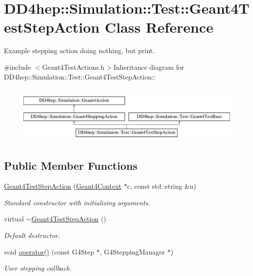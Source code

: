 \hypertarget{class_d_d4hep_1_1_simulation_1_1_test_1_1_geant4_test_step_action}{
\section{DD4hep::Simulation::Test::Geant4TestStepAction Class Reference}
\label{class_d_d4hep_1_1_simulation_1_1_test_1_1_geant4_test_step_action}
}


Example stepping action doing nothing, but print.  


{\ttfamily \#include $<$Geant4TestActions.h$>$}Inheritance diagram for DD4hep::Simulation::Test::Geant4TestStepAction::\begin{figure}[H]
\begin{center}
\leavevmode
\includegraphics[height=2.91667cm]{class_d_d4hep_1_1_simulation_1_1_test_1_1_geant4_test_step_action}
\end{center}
\end{figure}
\subsection*{Public Member Functions}
\begin{DoxyCompactItemize}
\item 
\hyperlink{class_d_d4hep_1_1_simulation_1_1_test_1_1_geant4_test_step_action_af4446b1635ed2c17bee1b7c074f3924d}{Geant4TestStepAction} (\hyperlink{class_d_d4hep_1_1_simulation_1_1_geant4_context}{Geant4Context} $\ast$c, const std::string \&n)
\begin{DoxyCompactList}\small\item\em Standard constructor with initializing arguments. \item\end{DoxyCompactList}\item 
virtual \hyperlink{class_d_d4hep_1_1_simulation_1_1_test_1_1_geant4_test_step_action_a0b645a06c4e038b0800054558ad99964}{$\sim$Geant4TestStepAction} ()
\begin{DoxyCompactList}\small\item\em Default destructor. \item\end{DoxyCompactList}\item 
void \hyperlink{class_d_d4hep_1_1_simulation_1_1_test_1_1_geant4_test_step_action_a19d915e8a634552f25a839a92843258a}{operator()} (const G4Step $\ast$, G4SteppingManager $\ast$)
\begin{DoxyCompactList}\small\item\em User stepping callback. \item\end{DoxyCompactList}\end{DoxyCompactItemize}


